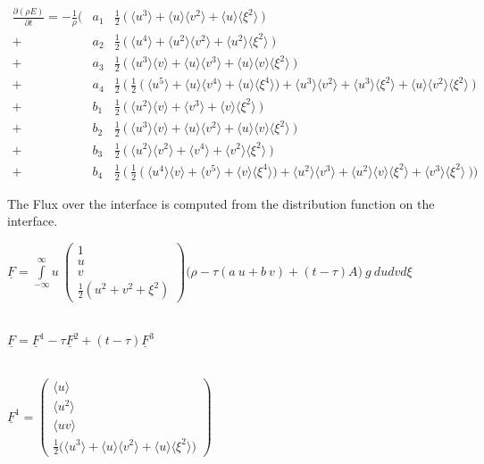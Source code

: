 \documentclass[
	pdftex,             %
	12pt,				%
	a4paper,		   	%
	english,				%
	oneside,			%
]{article}
\newcommand{\mom}[1]{\langle #1 \rangle}
\newcommand{\uu}[1]{\underline{#1}}
\begin{document}
\begin{eqnarray*}
\frac{\partial (\rho E)}{\partial t}
=
-\frac{1}{\rho}
\Bigg(
 &a_1& \frac{1}{2}~ \Big(~ \mom{u^3} + \mom{u}\mom{v^2} + \mom{u}\mom{\xi^2} ~\Big) \\
+&a_2& \frac{1}{2}~ \Big(~ \mom{u^4} + \mom{u^2}\mom{v^2} + \mom{u^2}\mom{\xi^2} ~\Big) \\
+&a_3& \frac{1}{2}~ \Big(~ \mom{u^3}\mom{v} + \mom{u}\mom{v^3} + \mom{u}\mom{v}\mom{\xi^2} ~\Big) \\
+&a_4& \frac{1}{2}~ \Big(~ \frac{1}{2}~
					\big(~ \mom{u^5} + \mom{u}\mom{v^4} + \mom{u}\mom{\xi^4} \big)
						 + \mom{u^3}\mom{v^2} + \mom{u^3}\mom{\xi^2} + \mom{u}\mom{v^2}\mom{\xi^2}
					~\Big)
\\
+&b_1& \frac{1}{2}~ \Big(~ \mom{u^2}\mom{v} + \mom{v^3} + \mom{v}\mom{\xi^2} ~\Big) \\
+&b_2& \frac{1}{2}~ \Big(~ \mom{u^3}\mom{v} + \mom{u}\mom{v^2} + \mom{u}\mom{v}\mom{\xi^2} ~\Big) \\
+&b_3& \frac{1}{2}~ \Big(~ \mom{u^2}\mom{v^2} + \mom{v^4} + \mom{v^2}\mom{\xi^2} ~\Big) \\
+&b_4& \frac{1}{2}~ \Big(~ \frac{1}{2}~
					\big(~  \mom{u^4}\mom{v} +\mom{v^5} + \mom{v}\mom{\xi^4} \big)
						 + \mom{u^2}\mom{v^3} + \mom{u^2}\mom{v}\mom{\xi^2} + \mom{v^3}\mom{\xi^2}
					~\Big)
\Bigg)
\end{eqnarray*}

\clearpage

The Flux over the interface is computed from the distribution function on the interface. 

\begin{math}
\uu{F} = 
\int \limits_{-\infty}^{\infty}
u~
\begin{pmatrix}
	1 \\ u \\ v \\ \frac{1}{2} (u^2 + v^2 + \xi^2)
\end{pmatrix}
\Big(
	\rho - \tau (a~u + b~v) + (t-\tau)A
\Big)
~g~ du dv d\xi
\end{math}

~\\

\begin{math}
\uu{F} = \uu{F}^1 - \tau \uu{F}^2 + (t - \tau) \uu{F}^3
\end{math}

~\\

\begin{math}
\uu{F}^1 =
\begin{pmatrix}
\mom{u} \\ 
\mom{u^2} \\ 
\mom{uv} \\ 
\frac{1}{2} \big(\mom{u^3} + \mom{u}\mom{v^2} + \mom{u}\mom{\xi^2} \big)
\end{pmatrix}
\end{math}
\end{document}
